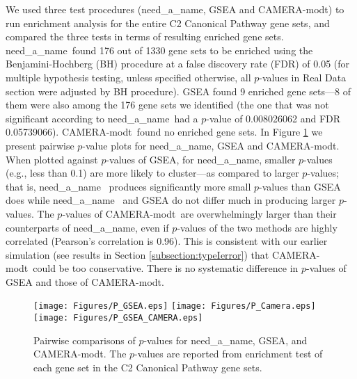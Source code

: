 \documentclass[useAMS,usenatbib, galley]{biom}
\newcommand{\OurMethod}{need\_a\_name}
\newcommand{\CMT}{CAMERA-modt}
\begin{document}
	
	We used three test procedures (\OurMethod, GSEA and \CMT) to run enrichment analysis for the entire C2 Canonical Pathway gene sets, and compared the three tests in terms of resulting enriched gene sets. \OurMethod~found 176 out of 1330 gene sets to be enriched using the Benjamini-Hochberg (BH) procedure at a false discovery rate (FDR) of 0.05 (for multiple hypothesis testing, unless specified otherwise, all $p$-values in Real Data section were adjusted by BH procedure). GSEA found 9 enriched gene sets---8 of them were also among the 176 gene sets we identified (the one that was not significant according to \OurMethod~had a $p$-value of 0.008026062 and FDR 0.05739066). \CMT~found no enriched gene sets. In Figure \ref{fig:HDdatap} we present pairwise $p$-value plots for \OurMethod, GSEA and \CMT. When plotted against $p$-values of GSEA, for \OurMethod, smaller $p$-values (e.g., less than 0.1) are more likely to cluster---as compared to larger $p$-values; that is, \OurMethod~ produces significantly more small $p$-values than GSEA does while \OurMethod~ and GSEA do not differ much in producing larger $p$-values.
	The $p$-values of \CMT~are overwhelmingly larger than their counterparts of \OurMethod, even if $p$-values of the two methods are highly correlated (Pearson's correlation is 0.96). This is consistent with our earlier simulation (see results in Section \ref{subsection:typeIerror}) that \CMT~could be too conservative. There is no systematic difference in $p$-values of GSEA and those of \CMT. 
	\begin{figure}
		\begin{center}
			\texttt{[image: Figures/P\_GSEA.eps]}
			\texttt{[image: Figures/P\_Camera.eps]}
			\texttt{[image: Figures/P\_GSEA\_CAMERA.eps]}
		\end{center} 
			\caption{Pairwise comparisons of $p$-values for \OurMethod, GSEA, and \CMT. The $p$-values are reported from enrichment test of each gene set in the C2 Canonical Pathway gene sets. }\label{fig:HDdatap}
	\end{figure} 
	
	
\end{document}
